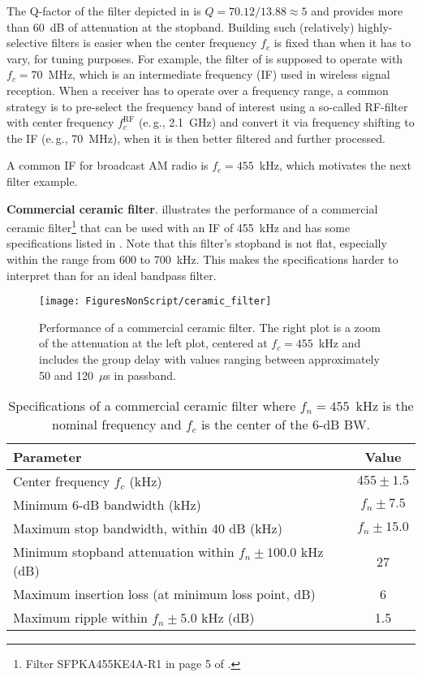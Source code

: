 The Q-factor of the filter depicted in  is $Q=70.12/13.88 \approx 5$ and provides more than 60~dB of attenuation at the stopband. Building such (relatively) highly-selective filters is easier when the center frequency $f_c$ is fixed than when it has to vary, for tuning purposes. For example, the filter of  is supposed to operate with $f_c=70$~MHz, which is an intermediate frequency (IF) used in wireless signal reception. When a receiver has to operate over a frequency range, a common strategy is to pre-select the frequency band of interest using a so-called RF-filter with center frequency $f_c^{\textrm{RF}}$ (e.\,g., 2.1~GHz) and convert it via frequency shifting to the IF (e.\,g., 70~MHz), when it is then better filtered and further processed. 
\eExample

A common IF for broadcast AM radio is $f_c=455$~kHz, which motivates the next filter example.

\bExample \textbf{Commercial ceramic filter}.
 illustrates the performance of a commercial ceramic filter\footnote{Filter SFPKA455KE4A-R1 in page 5 of
.} that can be used with an IF of 455~kHz and has some specifications listed in . 
Note that this filter's stopband is not flat, especially within the range from 600 to 700~kHz. This makes the specifications harder to interpret than for an ideal bandpass filter.

\begin{figure}
\centering
\texttt{[image: FiguresNonScript/ceramic\_filter]}
\caption[Performance of a commercial ceramic filter.]{Performance of a commercial ceramic filter. The right plot is a zoom of the attenuation at the left plot, centered at $f_c=455$~kHz and includes the group delay with values ranging between approximately 50 and 120~$\mu$s in passband.\label{fig:ceramic_filter}}
\end{figure}


\begin{table}
\centering
\caption{Specifications of a commercial ceramic filter where $f_n = 455$~kHz is the nominal frequency and $f_c$ is the center of the 6-dB BW.\label{tab:ceramicFilterSpecs}}
\begin{tabular}{|l|c|}
\hline
Parameter & Value \\ \hline
Center frequency $f_c$ (kHz) & $455 \pm 1.5$ \\ \hline
Minimum 6-dB bandwidth (kHz) & $f_n \pm 7.5$ \\ \hline
Maximum stop bandwidth, within 40 dB (kHz) & $f_n \pm 15.0$ \\ \hline
Minimum stopband attenuation within $f_n \pm 100.0$ kHz (dB) & 27 \\ \hline
Maximum insertion loss (at minimum loss point, dB) &  6 \\ \hline
Maximum ripple within $f_n \pm 5.0$ kHz (dB) & 1.5 \\ \hline
\end{tabular}
\end{table}

